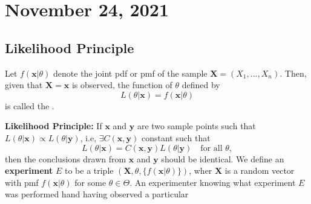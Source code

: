 \section{November 24, 2021}
\subsection{Likelihood Principle}
\begin{definition}
    Let $f(\boldsymbol{x}|\theta)$ denote the joint pdf or pmf of the sample $\boldsymbol{X} = (X_1,...,X_n)$. Then, given that $\boldsymbol{X} = \boldsymbol{x}$ is observed, the function of $\theta$ defined by $$
    L(\theta|\boldsymbol{x}) = f(\boldsymbol{x}|\theta)
    $$
    is called the .
\end{definition}
\textbf{Likelihood Principle:} If $\boldsymbol{x}$ and $\boldsymbol{y}$ are two sample points such that $L(\theta|\boldsymbol{x}) \propto L(\theta|\boldsymbol{y})$, i.e, $\exists C(\boldsymbol{x},\boldsymbol{y})$ constant such that
$$
    L(\theta|\boldsymbol{x}) = C(\boldsymbol{x},\boldsymbol{y}) L(\theta|\boldsymbol{y}) \quad \text{for all } \theta,
$$
then the conclusions drawn from $\boldsymbol{x}$ and $\boldsymbol{y}$ should be identical. 
We define an \textbf{experiment} $E$ to be a triple $(\boldsymbol{X}, \theta, \{f(\boldsymbol{x}|\theta)\})$, wher $\boldsymbol{X}$ is a random vector with pmf $f(\boldsymbol{x}|\theta)$ for some $\theta \in \Theta$. An experimenter knowing what experiment $E$ was performed hand having observed a particular 
